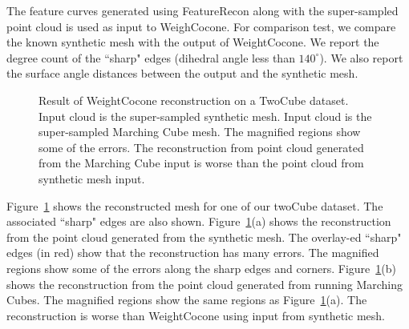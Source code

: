 The feature curves generated using FeatureRecon along with the super-sampled point cloud is used as input to WeighCocone. For comparison test, we compare the known synthetic mesh with the output of WeightCocone. 
We report the degree count of the ``sharp" edges (dihedral angle less than $140^\circ$). We also report the surface angle distances between the output and the synthetic mesh. 
\begin{figure}[t] 
	\centering 
	\caption{Result of WeightCocone reconstruction on a TwoCube dataset. \protect{} Input cloud is the super-sampled synthetic mesh. \protect{} Input cloud is the super-sampled Marching Cube mesh. The magnified regions show some of the errors. The reconstruction from point cloud generated from the Marching Cube input is worse than the  point cloud from synthetic mesh input. }
	\label{fig:cocone_compare_from_perfect_1}
	\vskip-0.2cm
\end{figure} 

Figure~\ref{fig:cocone_compare_from_perfect_1} shows the reconstructed mesh for one of our twoCube dataset. The associated ``sharp" edges are also shown. Figure~\ref{fig:cocone_compare_from_perfect_1}(a) shows the reconstruction from the point cloud generated from the synthetic mesh. The overlay-ed ``sharp" edges (in red) show that the reconstruction has many errors. The magnified regions show some of the errors along the sharp edges and corners. Figure~\ref{fig:cocone_compare_from_perfect_1}(b) shows the reconstruction from the point cloud generated from running Marching Cubes. The magnified regions show the same regions as Figure~\ref{fig:cocone_compare_from_perfect_1}(a). The reconstruction is worse than WeightCocone using input from synthetic mesh. 

